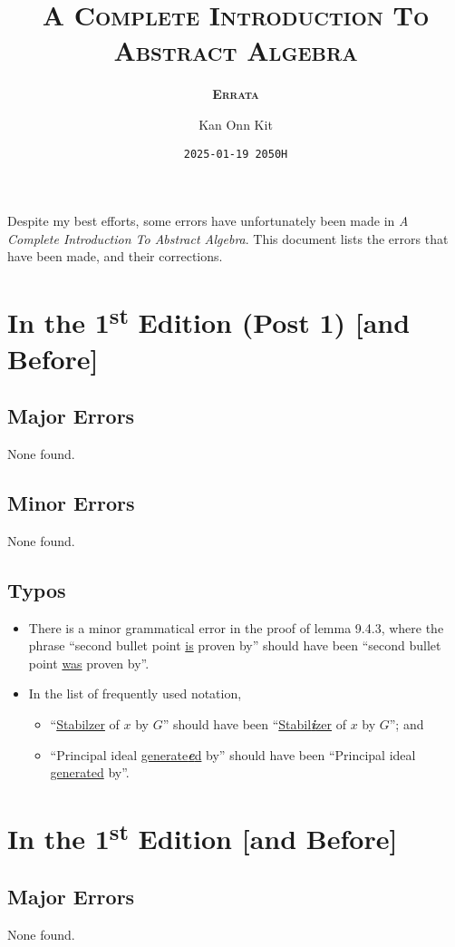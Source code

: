 \documentclass[
    a4paper,
    chapterprefix,
    DIV=9
]{scrartcl}
\title{\bfseries\scshape A Complete Introduction To\\Abstract Algebra}
\subtitle{\bfseries\scshape Errata}
\date{\texttt{2025-01-19 2050H}}
\author{Kan Onn Kit}
\begin{document}
\maketitle

Despite my best efforts, some errors have unfortunately been made in \textit{A Complete Introduction To Abstract Algebra}. This document lists the errors that have been made, and their corrections.

\section*{In the 1\textsuperscript{st} Edition (Post 1) [and Before]}
\subsection*{Major Errors}
None found.

\subsection*{Minor Errors}
None found.

\subsection*{Typos}
\begin{itemize}
    \item There is a minor grammatical error in the proof of lemma 9.4.3, where the phrase ``second bullet point \underline{is} proven by'' should have been ``second bullet point \underline{was} proven by''.
    \item In the list of frequently used notation,
    \begin{itemize}
        \item ``\underline{Stabilzer} of $x$ by $G$'' should have been ``\underline{Stabil\textbf{\textit{i}}zer} of $x$ by $G$''; and
        \item ``Principal ideal \underline{generate\textbf{\textit{e}}d} by'' should have been ``Principal ideal \underline{generated} by''.
    \end{itemize}
\end{itemize}

\section*{In the 1\textsuperscript{st} Edition [and Before]}
\subsection*{Major Errors}
None found.
\end{document}
